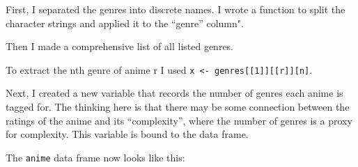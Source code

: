 \documentclass[
]{article}
\newenvironment{Shaded}{\begin{snugshade}}{\end{snugshade}}
\newcommand{\CommentTok}[1]{\textcolor[rgb]{0.56,0.35,0.01}{\textit{#1}}}
\newcommand{\ControlFlowTok}[1]{\textcolor[rgb]{0.13,0.29,0.53}{\textbf{#1}}}
\newcommand{\DecValTok}[1]{\textcolor[rgb]{0.00,0.00,0.81}{#1}}
\newcommand{\KeywordTok}[1]{\textcolor[rgb]{0.13,0.29,0.53}{\textbf{#1}}}
\newcommand{\NormalTok}[1]{#1}
\newcommand{\OperatorTok}[1]{\textcolor[rgb]{0.81,0.36,0.00}{\textbf{#1}}}
\newcommand{\StringTok}[1]{\textcolor[rgb]{0.31,0.60,0.02}{#1}}
\begin{document}
First, I separated the genres into discrete names. I wrote a function to
split the character strings and applied it to the ``genre'' column".

Then I made a comprehensive list of all listed genres.

To extract the nth genre of anime r I used
\texttt{x\ \textless{}-\ genres{[}{[}1{]}{]}{[}{[}r{]}{]}{[}n{]}}.

\begin{Shaded}
\end{Shaded}

Next, I created a new variable that records the number of genres each
anime is tagged for. The thinking here is that there may be some
connection between the ratings of the anime and its ``complexity'',
where the number of genres is a proxy for complexity. This variable is
bound to the data frame.

The \texttt{anime} data frame now looks like this:
\end{document}
